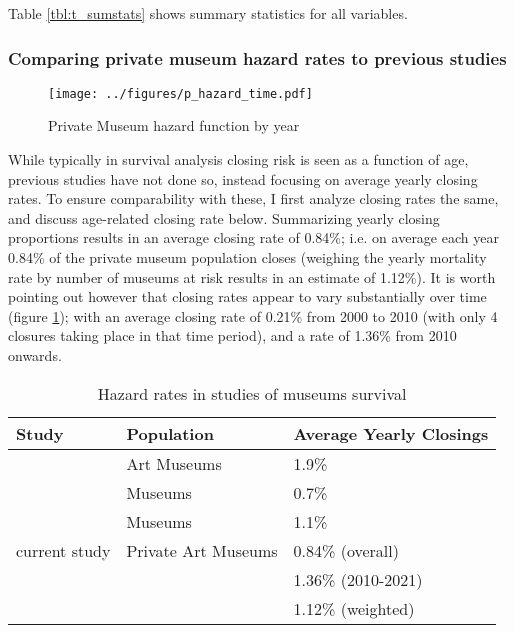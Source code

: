 \documentclass[12pt]{article}
\begin{document}
Table \ref{tbl:t_sumstats} shows summary statistics for all variables.
\subsubsection*{Comparing private museum hazard rates to previous studies}

\begin{figure}[htbp]
\centering
\texttt{[image: ../figures/p\_hazard\_time.pdf]}
\caption{\label{fig:p_hazard_time}Private Museum hazard function by year}
\end{figure}

While typically in survival analysis closing risk is seen as a function of age, previous studies have not done so, instead focusing on average yearly closing rates.
To ensure comparability with these, I first analyze closing rates the same, and discuss age-related closing rate below.
Summarizing yearly closing proportions results in an average closing rate of 0.84\%; i.e. on average each year 0.84\% of the private museum population closes (weighing the yearly mortality rate by number of museums at risk results in an estimate of 1.12\%).
It is worth pointing out however that closing rates appear to vary substantially over time (figure \ref{fig:p_hazard_time}); with an average closing rate of 0.21\% from 2000 to 2010 (with only 4 closures taking place in that time period), and a rate of 1.36\% from 2010 onwards.


\begin{table}[htbp]
\caption{\label{tbl:litreview}Hazard rates in studies of museums survival}
\centering
\begin{tabular}{lll}
\hline
Study & Population & Average Yearly Closings\\
\hline
\cite{Hager_2001_vulnerability} & Art Museums & 1.9\%\\
\cite{Gordon_etal_2013_insolvency} & Museums & 0.7\%\\
\cite{Bowen_etal_1994_charitable} & Museums & 1.1\%\\
current study & Private Art Museums & 0.84\% (overall)\\
 &  & 1.36\% (2010-2021)\\
 &  & 1.12\% (weighted)\\
\hline
\end{tabular}
\end{table}

\FloatBarrier
\end{document}
